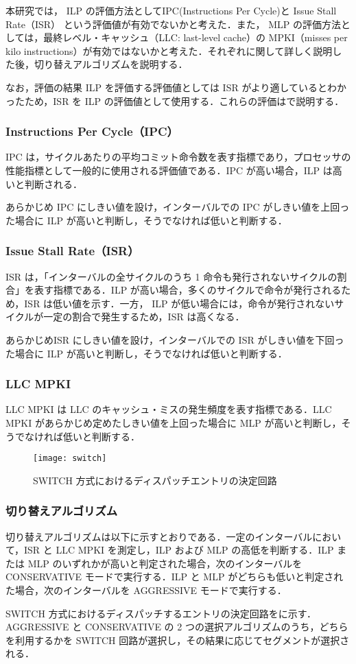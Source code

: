 本研究では， ILP の評価方法としてIPC(Instructions Per Cycle)と Issue Stall Rate（ISR） という評価値が有効でないかと考えた．また， MLP の評価方法としては，最終レベル・キャッシュ（LLC: last-level cache）の MPKI（misses per kilo instructions）が有効ではないかと考えた．それぞれに関して詳しく説明した後，切り替えアルゴリズムを説明する．

なお，評価の結果 ILP を評価する評価値としては ISR がより適しているとわかったため，ISR を ILP の評価値として使用する．これらの評価はで説明する．

\subsubsection{Instructions Per Cycle（IPC）}
IPC は，サイクルあたりの平均コミット命令数を表す指標であり，プロセッサの性能指標として一般的に使用される評価値である．IPC が高い場合，ILP は高いと判断される．

あらかじめ IPC にしきい値を設け，インターバルでの IPC がしきい値を上回った場合に ILP が高いと判断し，そうでなければ低いと判断する．

\subsubsection{Issue Stall Rate（ISR）}
ISR は，「インターバルの全サイクルのうち 1 命令も発行されないサイクルの割合」を表す指標である．ILP が高い場合，多くのサイクルで命令が発行されるため，ISR は低い値を示す．一方， ILP が低い場合には，命令が発行されないサイクルが一定の割合で発生するため，ISR は高くなる．

あらかじめISR にしきい値を設け，インターバルでの ISR がしきい値を下回った場合に ILP が高いと判断し，そうでなければ低いと判断する．

\subsubsection{LLC MPKI}
LLC MPKI は LLC のキャッシュ・ミスの発生頻度を表す指標である．LLC MPKI があらかじめ定めたしきい値を上回った場合に MLP が高いと判断し，そうでなければ低いと判断する．

\begin{figure}[htb]
  \centering
  \texttt{[image: switch]}
  \caption{SWITCH 方式におけるディスパッチエントリの決定回路}
  \label{fig:switch}
\end{figure}

\subsubsection{切り替えアルゴリズム}
切り替えアルゴリズムは以下に示すとおりである．一定のインターバルにおいて，ISR と LLC MPKI を測定し，ILP および MLP の高低を判断する．ILP または MLP のいずれかが高いと判定された場合，次のインターバルを CONSERVATIVE モードで実行する．ILP と MLP がどちらも低いと判定された場合，次のインターバルを AGGRESSIVE モードで実行する．

SWITCH 方式におけるディスパッチするエントリの決定回路をに示す．AGGRESSIVE と CONSERVATIVE の 2 つの選択アルゴリズムのうち，どちらを利用するかを SWITCH 回路が選択し，その結果に応じてセグメントが選択される．
